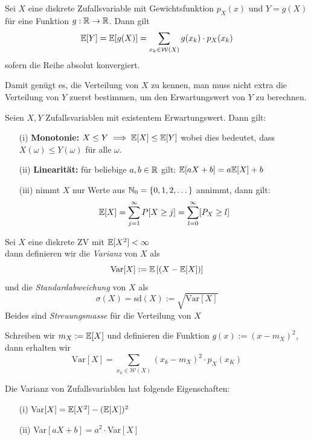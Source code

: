 \begin{satz}
Sei $X$ eine diskrete Zufallsvariable mit Gewichtsfunktion $p_X(x)$ und $Y = g(X)$ für eine Funktion $g:\mathbb{R} \to \mathbb{R}$. Dann gilt
$$ \mathbb{E}[Y] = \mathbb{E}[g(X)] = \sum_{x_k \in \mathcal{W}(X)} g(x_k) \cdot p_X(x_k)$$
sofern die Reihe absolut konvergiert.
\end{satz}
Damit genügt es, die Verteilung von $X$ zu kennen, man muss nicht extra die Verteilung von $Y$ zuerst bestimmen, um den Erwartungswert von $Y$ zu berechnen.

\begin{satz}
Seien $X,Y$ Zufallsvariablen mit existentem Erwartungswert. Dann gilt:
\begin{itemize}
\item[(i)] \textbf{Monotonie:} $X \leq Y \implies \mathbb{E}[X] \leq \mathbb{E}[Y]$ wobei dies bedeutet, dass $X(\omega) \leq Y(\omega)$ für alle $\omega$.
\item[(ii)] \textbf{Linearität:} für beliebige $a,b \in \mathbb{R}$ gilt: $\mathbb{E}[aX+b] = a\mathbb{E}[X] + b$
\item[(iii)] nimmt $X$ nur Werte aus $\mathbb{N}_0 = \{0,1,2,\dots\}$ annimmt, dann gilt:
$$ \mathbb{E}[X] = \sum_{j=1}^\infty P[X \geq j] = \sum_{l = 0}^\infty [P_X \geq l]$$
\end{itemize}
\end{satz}

\begin{definition}
Sei $X$ eine diskrete ZV mit $\mathbb{E}[X^2] < \infty$\\ dann definieren wir die \textit{Varianz} von $X$ als
$$ \mbox{Var}[X] := \mathbb{E}\left[(X - \mathbb{E}[X])\right]$$ und die \textit{Standardabweichung} von $X$ als
$$ \sigma(X) = \mbox{sd}(X) := \sqrt{\mbox{Var}[X]}$$
Beides sind \textit{Streuungsmasse} für die Verteilung von $X$
\end{definition}

Schreiben wir $m_X := \mathbb{E}[X]$ und definieren die Funktion $g(x):= (x-m_X)^2$, dann erhalten wir
$$ \mbox{Var}[X] = \sum_{x_k \in \mathcal{W}(X)} (x_k - m_X)^2 \cdot p_X(x_K)$$

\begin{lemma}
Die Varianz von Zufallsvariablen hat folgende Eigenschaften:
\begin{itemize}
\item[(i)] Var$[X] = \mathbb{E}[X^2] - (\mathbb{E}[X])^2$
\item[(ii)] Var$[aX + b] = a^2 \cdot $Var$[X]$
\end{itemize}
\end{lemma}


